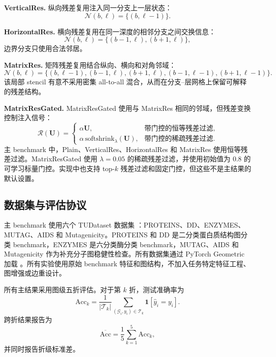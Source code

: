 \documentclass[UTF8,10pt]{ctexart}
\let\cite\citep
\begin{document}
\textbf{VerticalRes.} 纵向残差复用注入同一分支上一层状态：
\begin{equation}
\mathcal{N}(b,\ell)=\{(b,\ell-1)\}.
\end{equation}

\textbf{HorizontalRes.} 横向残差复用在同一深度的相邻分支之间交换信息：
\begin{equation}
\mathcal{N}(b,\ell)=\{(b-1,\ell),(b+1,\ell)\},
\end{equation}
边界分支只使用合法邻居。

\textbf{MatrixRes.} 矩阵残差复用结合纵向、横向和对角邻域：
\begin{equation}
\mathcal{N}(b,\ell)=
\{(b,\ell-1),(b-1,\ell),(b+1,\ell),(b-1,\ell-1),(b+1,\ell-1)\}.
\end{equation}
该局部 stencil 有意不采用密集 all-to-all 混合，从而在分支--层网格上保留可解释的残差结构。

\textbf{MatrixResGated.} MatrixResGated 使用与 MatrixRes 相同的邻域，但残差变换控制注入信号：
\begin{equation}
\mathcal{R}(\mathbf{U}) =
\begin{cases}
\alpha \mathbf{U}, & \text{带门控的恒等残差过滤},\\
\alpha\,\mathrm{softshrink}_{\lambda}(\mathbf{U}), & \text{带门控的稀疏残差过滤}.
\end{cases}
\end{equation}
主 benchmark 中，Plain、VerticalRes、HorizontalRes 和 MatrixRes 使用恒等残差过滤。MatrixResGated 使用 \(\lambda=0.05\) 的稀疏残差过滤，并使用初始值为 0.8 的可学习标量门控。实现中也支持 top-\(k\) 残差过滤和固定门控，但这些不是主结果的默认设置。

\subsection{数据集与评估协议}
\label{sec:datasets}

主 benchmark 使用六个 TUDataset 数据集 \cite{morris2020tudataset}：PROTEINS、DD、ENZYMES、MUTAG、AIDS 和 Mutagenicity。PROTEINS 和 DD 是二分类蛋白质结构图分类 benchmark，ENZYMES 是六分类酶分类 benchmark，MUTAG、AIDS 和 Mutagenicity 作为补充分子图稳健性检查。所有数据集通过 PyTorch Geometric 加载 \cite{fey2019fast}。所有实验使用原始 benchmark 特征和图结构，不加入任务特定特征工程、图增强或边重设计。

所有主结果采用图级五折评估。对于第 \(k\) 折，测试准确率为
\begin{equation}
\mathrm{Acc}_{k}=
\frac{1}{|\mathcal{T}_{k}|}
\sum_{(\mathcal{G}_{i},y_{i})\in\mathcal{T}_{k}}
\mathbf{1}[\hat{y}_{i}=y_{i}].
\end{equation}
跨折结果报告为
\begin{equation}
\overline{\mathrm{Acc}}=\frac{1}{5}\sum_{k=1}^{5}\mathrm{Acc}_{k},
\end{equation}
并同时报告折级标准差。
\end{document}
